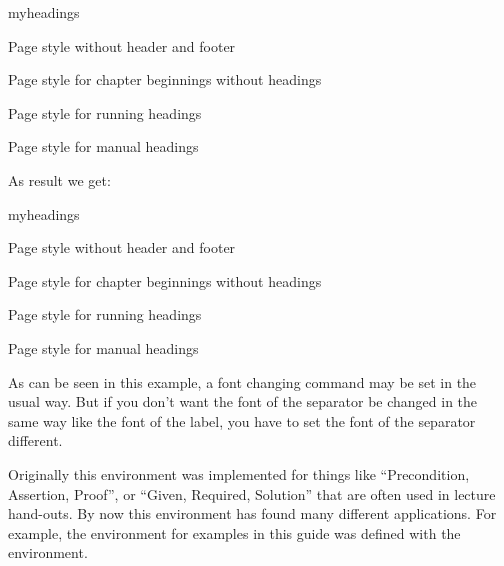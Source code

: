 \begin{Example}
  \label{desc:\csname
    label@base\endcsname.env.labeling.example}%
\begin{lstcode}
  \begin{labeling}[~--]{myheadings}
    \item[empty]
      Page style without header and footer
    \item[plain]
      Page style for chapter beginnings without headings
    \item[headings]
      Page style for running headings
    \item[myheadings]
      Page style for manual headings
  \end{labeling}
\end{lstcode}
  As result we get:
  \begin{ShowOutput}
    \begin{labeling}[~--]{myheadings}
    \item[empty]
      Page style without header and footer
    \item[plain]
      Page style for chapter beginnings without headings
    \item[headings]
      Page style for running headings
    \item[myheadings]
      Page style for manual headings
    \end{labeling}
  \end{ShowOutput}
  As can be seen in this example, a font changing command may be set in the
  usual way. But if you don't want the font of the separator be changed in the
  same way like the font of the label, you have to set the font of the
  separator different.
\end{Example}
\fi%
Originally this environment was implemented for things like ``Precondition,
Assertion, Proof'', or ``Given, Required, Solution'' that are often used in
lecture hand-outs.  By now this environment has found many different
applications. For example, the environment for examples in this guide was
defined with the  environment.%
%
%
%


